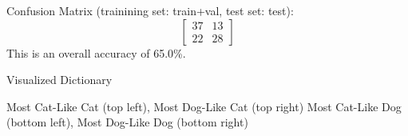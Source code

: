 \documentclass[fleqn]{article}
\begin{document}
Confusion Matrix (trainining set: train+val, test set: test):
\[
  \begin{bmatrix}
    37 & 13 \\
    22 & 28
  \end{bmatrix}
\]
This is an overall accuracy of 65.0\%.
\begin{center}
    Visualized Dictionary
\end{center}
\begin{center}
    Most Cat-Like Cat (top left), Most Dog-Like Cat (top right)\break
    Most Cat-Like Dog (bottom left), Most Dog-Like Dog (bottom right)
\end{center}
\end{document}
